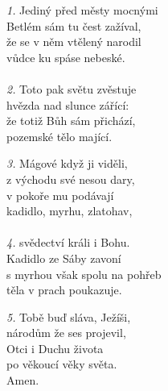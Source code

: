 \begin{translatioMulticol}{3}
{\color{red}\textit{1.}} Jediný před městy mocnými\\
Betlém sám tu čest zažíval,\\
že se v něm vtělený narodil\\
vůdce ku spáse nebeské.\\
\\
{\color{red}\textit{2.}} Toto pak světu zvěstuje\\
hvězda nad slunce zářící:\\
že totiž Bůh sám přichází,\\
pozemské tělo mající.\columnbreak

{\color{red}\textit{3.}} Mágové když ji viděli,\\
z východu své nesou dary,\\
v pokoře mu podávají\\
kadidlo, myrhu, zlatohav,\\
\\
{\color{red}\textit{4.}} svědectví králi i Bohu.\\
Kadidlo ze Sáby zavoní\\
s myrhou však spolu na pohřeb\\
těla v prach poukazuje.\columnbreak

{\color{red}\textit{5.}} Tobě buď sláva, Ježíši,\\
národům že ses projevil,\\
Otci i Duchu života\\
po věkoucí věky světa.\\
Amen.
\end{translatioMulticol}
